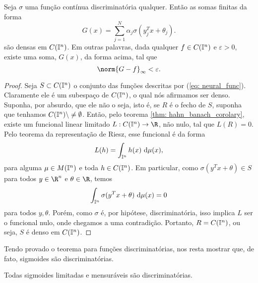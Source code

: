 \begin{TAU}
    Seja \( \sigma \) uma função contínua discriminatória qualquer.
    Então as somas finitas da forma
    \begin{equation}
        G(x) = \sum_{ j=1 }^{ N } \alpha_{ j } \sigma(y_{ j }^{ T }x + \theta_{ j })
        \label{eq: neural_func}
    .\end{equation}
    são densas em \( C(\mathbb{I}^{ n }) \).
    Em outras palavras, dada qualquer \( f \in C(\mathbb{I}^{ n }) \) e \( \varepsilon > 0 \), existe uma soma, \( G(x) \), da forma acima, tal que \[
        \norm{ G - f }_{ \infty } < \varepsilon
    .\]
\end{TAU}

\begin{proof}
    Seja \( S \subset C(\mathbb{I}^{ n }) \) o conjunto das funções descritas por (\ref{eq: neural_func}).
    Claramente ele é um subespaço de \( C(\mathbb{I}^{ n }) \), o qual nós afirmamos ser denso.
    Suponha, por absurdo, que ele não o seja, isto é, se \( R \) é o fecho de \( S \), suponha que tenhamos \( C(\mathbb{I}^{ n }) \backslash \neq \emptyset \).
    Então, pelo teorema \ref{thm: hahn_banach_corolary}, existe um funcional linear limitado \( L : C(\I^{ n }) \to \R \), não nulo, tal que \( L(R) = 0 \).
    Pelo teorema da representação de Riesz, esse funcional é da forma \[
        L(h)
        = \int_{ \mathbb{I}^{ n } } h(x) \ \mathrm{d}\mu(x)
    ,\]
    para alguma \( \mu \in M(\mathbb{I}^{ n }) \) e toda \( h \in C(\mathbb{I}^{ n }) \).
    Em particular, como \( \sigma(y^{ T }x + \theta) \in S \) para todos \( y \in \R^{ n } \) e \( \theta \in \R \), temos \[
        \int_{ \I^{ n } } \sigma(y^{ T }x + \theta) \ \mathrm{d}\mu(x) = 0
    \]
    para todos \( y, \theta \).
    Porém, como \( \sigma \) é, por hipótese, discriminatória, isso implica \( L \) ser o funcional nulo, onde chegamos a uma contradição.
    Portanto, \( R = C(\mathbb{I}^{ n }) \), ou seja, \( S \) é denso em \( C(\mathbb{I}^{ n }) \).
\end{proof}

Tendo provado o teorema para funções discriminatórias, nos resta mostrar que, de fato, sigmoides são discriminatórias.

\begin{lem}
    Todas sigmoides limitadas e mensuráveis são discriminatórias.
\end{lem}

